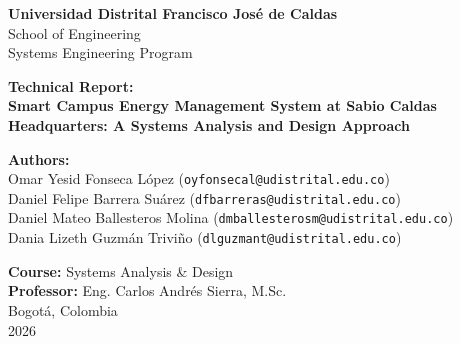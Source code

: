 \documentclass[12pt,a4paper]{article}
\begin{document}
\begin{titlepage}
    \centering
    \vspace*{1cm}
    
    {\Large \textbf{Universidad Distrital Francisco José de Caldas}} \\
    \vspace{0.5cm}
    {\large School of Engineering \\ Systems Engineering Program} \\
    
    \vspace{3cm}
    
    {\Huge \textbf{Technical Report:}} \\
    \vspace{0.5cm}
    {\Large \textbf{Smart Campus Energy Management System at Sabio Caldas Headquarters: A Systems Analysis and Design Approach}} \\
    
    \vspace{3cm}
    
    \textbf{Authors:} \\
    Omar Yesid Fonseca López (\texttt{oyfonsecal@udistrital.edu.co}) \\
    Daniel Felipe Barrera Suárez (\texttt{dfbarreras@udistrital.edu.co}) \\
    Daniel Mateo Ballesteros Molina (\texttt{dmballesterosm@udistrital.edu.co}) \\
    Dania Lizeth Guzmán Triviño (\texttt{dlguzmant@udistrital.edu.co}) \\
    
    \vfill
    
    \textbf{Course:} Systems Analysis \& Design \\
    \textbf{Professor:} Eng. Carlos Andrés Sierra, M.Sc. \\
    
    \vspace{1cm}
    Bogotá, Colombia \\
    2026
    
\end{titlepage}

\end{document}
